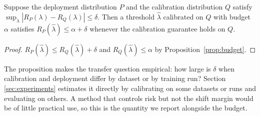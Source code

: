 \begin{proposition}
\label{prop:shift}
Suppose the deployment distribution $P$ and the calibration distribution $Q$
satisfy $\sup_\lambda|R_P(\lambda)-R_Q(\lambda)|\le\delta$. Then a threshold
$\hat\lambda$ calibrated on $Q$ with budget $\alpha$ satisfies
$R_P(\hat\lambda)\le\alpha+\delta$ whenever the calibration guarantee holds on
$Q$.
\end{proposition}

\begin{proof}
$R_P(\hat\lambda)\le R_Q(\hat\lambda)+\delta$ and
$R_Q(\hat\lambda)\le\alpha$ by Proposition~\ref{prop:budget}.
\end{proof}

The proposition makes the transfer question empirical: how large is $\delta$
when calibration and deployment differ by dataset or by training run? Section
\ref{sec:experiments} estimates it directly by calibrating on some datasets or
runs and evaluating on others. A method that controls risk but not the shift
margin would be of little practical use, so this is the quantity we report
alongside the budget.
